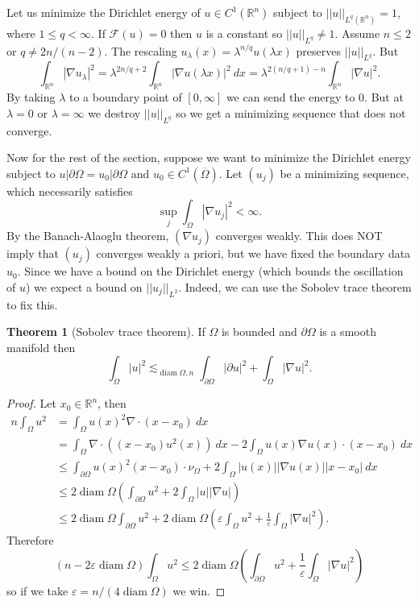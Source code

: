 \documentclass[12pt]{book}
\newcommand{\RR}{\mathbb{R}}
\DeclareMathOperator{\diam}{diam}
\theoremstyle{definition}
\newtheorem{theorem}{Theorem}[chapter]
\newenvironment{example}
  {\pushQED{\qed}\renewcommand{\qedsymbol}{$\diamondsuit$}\examplex}
  {\popQED\endexamplex}
\begin{document}
\begin{example}
Let us minimize the Dirichlet energy of $u \in C^1(\RR^n)$ subject to $||u||_{L^q(\RR^n)} = 1$, where $1 \leq q < \infty$.
If $\mathcal F(u) = 0$ then $u$ is a constant so $||u||_{L^q} \neq 1$.
Assume $n \leq 2$ or $q \neq 2n/(n-2)$.
The rescaling $u_\lambda(x) = \lambda^{n/q} u(\lambda x)$ preserves $||u||_{L^q}$.
But
$$\int_{\RR^n} |\nabla u_\lambda|^2 = \lambda^{2n/q + 2} \int_{\RR^n} |\nabla u(\lambda x)|^2 ~dx = \lambda^{2(n/q + 1) - n} \int_{\RR^n} |\nabla u|^2.$$
By taking $\lambda$ to a boundary point of $[0, \infty]$ we can send the energy to $0$.
But at $\lambda = 0$ or $\lambda = \infty$ we destroy $||u||_{L^q}$ so we get a minimizing sequence that does not converge.
\end{example}

Now for the rest of the section, suppose we want to minimize the Dirichlet energy subject to $u|\partial \Omega = u_0|\partial \Omega$ and $u_0 \in C^1(\overline \Omega)$.
Let $(u_j)$ be a minimizing sequence, which necessarily satisfies
$$\sup_j \int_\Omega |\nabla u_j|^2 < \infty.$$
By the Banach-Alaoglu theorem, $(\nabla u_j)$ converges weakly.
This does NOT imply that $(u_j)$ converges weakly a priori, but we have fixed the boundary data $u_0$.
Since we have a bound on the Dirichlet energy (which bounds the oscillation of $u$) we expect a bound on $||u_j||_{L^2}$.
Indeed, we can use the Sobolev trace theorem to fix this.

\begin{theorem}[Sobolev trace theorem]
If $\Omega$ is bounded and $\partial \Omega$ is a smooth manifold then
$$\int_\Omega |u|^2 \lesssim_{\diam \Omega, n} \int_{\partial \Omega} |\partial u|^2 + \int_\Omega |\nabla u|^2.$$
\end{theorem}
\begin{proof}
Let $x_0 \in \RR^n$, then
\begin{align*}
n\int_\Omega u^2 &= \int_\Omega u(x)^2 \nabla \cdot(x - x_0) ~dx \\
&= \int_\Omega \nabla \cdot((x - x_0)u^2(x)) ~dx - 2\int_\Omega u(x) \nabla u(x) \cdot (x - x_0) ~dx\\
&\leq \int_{\partial \Omega} u(x)^2 (x - x_0) \cdot \nu_\Omega + 2\int_\Omega |u(x)||\nabla u(x)||x - x_0| ~dx\\
&\leq 2 \diam \Omega \left(\int_{\partial \Omega} u^2 + 2\int_\Omega |u||\nabla u|\right)\\
&\leq 2 \diam \Omega \int_{\partial \Omega} u^2 + 2\diam \Omega \left(\varepsilon \int_\Omega u^2 + \frac{1}{\varepsilon} \int_\Omega |\nabla u|^2\right).
\end{align*}
Therefore
$$(n - 2\varepsilon\diam \Omega) \int_\Omega u^2 \leq 2 \diam \Omega \left(\int_{\partial \Omega} u^2 + \frac{1}{\varepsilon} \int_\Omega |\nabla u|^2\right)$$
so if we take $\varepsilon = n/(4 \diam \Omega)$ we win.
\end{proof}
\end{document}
